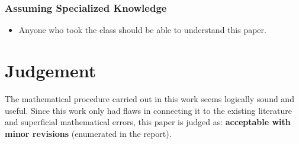 \documentclass[10pt,letterpaper]{article}
\begin{document}
			\subsubsection{Assuming Specialized Knowledge}
			
				\begin{itemize}
					\item Anyone who took the class should be able to understand this paper.
				\end{itemize}
			
	\section{Judgement}
	
		The mathematical procedure carried out in this work seems logically sound and useful.
		Since this work only had flaws in connecting it to the existing literature and superficial mathematical errors, this paper is judged as: \textbf{acceptable with minor revisions} (enumerated in the report).
	
		
	
\end{document}
